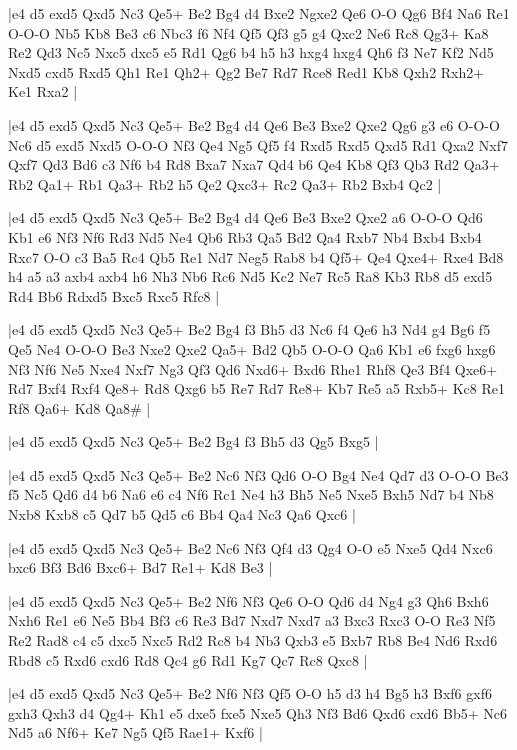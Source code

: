 \whitename{}
\blackname{}
\makegametitle
|e4 d5 exd5 Qxd5 Nc3 Qe5+ Be2 Bg4 d4 Bxe2 Ngxe2 Qe6 O-O Qg6 Bf4 Na6 Re1 O-O-O Nb5 Kb8 Be3 c6 Nbc3 f6 Nf4 Qf5 Qf3 g5 g4 Qxc2 Ne6 Rc8 Qg3+ Ka8 Re2 Qd3 Nc5 Nxc5 dxc5 e5 Rd1 Qg6 b4 h5 h3 hxg4 hxg4 Qh6 f3 Ne7 Kf2 Nd5 Nxd5 cxd5 Rxd5 Qh1 Re1 Qh2+ Qg2 Be7 Rd7 Rce8 Red1 Kb8 Qxh2 Rxh2+ Ke1 Rxa2  |

\whitename{}
\blackname{}
\makegametitle
|e4 d5 exd5 Qxd5 Nc3 Qe5+ Be2 Bg4 d4 Qe6 Be3 Bxe2 Qxe2 Qg6 g3 e6 O-O-O Nc6 d5 exd5 Nxd5 O-O-O Nf3 Qe4 Ng5 Qf5 f4 Rxd5 Rxd5 Qxd5 Rd1 Qxa2 Nxf7 Qxf7 Qd3 Bd6 c3 Nf6 b4 Rd8 Bxa7 Nxa7 Qd4 b6 Qe4 Kb8 Qf3 Qb3 Rd2 Qa3+ Rb2 Qa1+ Rb1 Qa3+ Rb2 h5 Qe2 Qxc3+ Rc2 Qa3+ Rb2 Bxb4 Qc2  |

\whitename{}
\blackname{}
\makegametitle
|e4 d5 exd5 Qxd5 Nc3 Qe5+ Be2 Bg4 d4 Qe6 Be3 Bxe2 Qxe2 a6 O-O-O Qd6 Kb1 e6 Nf3 Nf6 Rd3 Nd5 Ne4 Qb6 Rb3 Qa5 Bd2 Qa4 Rxb7 Nb4 Bxb4 Bxb4 Rxc7 O-O c3 Ba5 Rc4 Qb5 Re1 Nd7 Neg5 Rab8 b4 Qf5+ Qe4 Qxe4+ Rxe4 Bd8 h4 a5 a3 axb4 axb4 h6 Nh3 Nb6 Rc6 Nd5 Kc2 Ne7 Rc5 Ra8 Kb3 Rb8 d5 exd5 Rd4 Bb6 Rdxd5 Bxc5 Rxc5 Rfc8  |

\whitename{}
\blackname{}
\makegametitle
|e4 d5 exd5 Qxd5 Nc3 Qe5+ Be2 Bg4 f3 Bh5 d3 Nc6 f4 Qe6 h3 Nd4 g4 Bg6 f5 Qe5 Ne4 O-O-O Be3 Nxe2 Qxe2 Qa5+ Bd2 Qb5 O-O-O Qa6 Kb1 e6 fxg6 hxg6 Nf3 Nf6 Ne5 Nxe4 Nxf7 Ng3 Qf3 Qd6 Nxd6+ Bxd6 Rhe1 Rhf8 Qe3 Bf4 Qxe6+ Rd7 Bxf4 Rxf4 Qe8+ Rd8 Qxg6 b5 Re7 Rd7 Re8+ Kb7 Re5 a5 Rxb5+ Kc8 Re1 Rf8 Qa6+ Kd8 Qa8\#  |

\whitename{}
\blackname{}
\makegametitle
|e4 d5 exd5 Qxd5 Nc3 Qe5+ Be2 Bg4 f3 Bh5 d3 Qg5 Bxg5  |

\whitename{}
\blackname{}
\makegametitle
|e4 d5 exd5 Qxd5 Nc3 Qe5+ Be2 Nc6 Nf3 Qd6 O-O Bg4 Ne4 Qd7 d3 O-O-O Be3 f5 Nc5 Qd6 d4 b6 Na6 e6 c4 Nf6 Rc1 Ne4 h3 Bh5 Ne5 Nxe5 Bxh5 Nd7 b4 Nb8 Nxb8 Kxb8 c5 Qd7 b5 Qd5 c6 Bb4 Qa4 Nc3 Qa6 Qxc6  |

\whitename{}
\blackname{}
\makegametitle
|e4 d5 exd5 Qxd5 Nc3 Qe5+ Be2 Nc6 Nf3 Qf4 d3 Qg4 O-O e5 Nxe5 Qd4 Nxc6 bxc6 Bf3 Bd6 Bxc6+ Bd7 Re1+ Kd8 Be3  |

\whitename{}
\blackname{}
\makegametitle
|e4 d5 exd5 Qxd5 Nc3 Qe5+ Be2 Nf6 Nf3 Qe6 O-O Qd6 d4 Ng4 g3 Qh6 Bxh6 Nxh6 Re1 e6 Ne5 Bb4 Bf3 c6 Re3 Bd7 Nxd7 Nxd7 a3 Bxc3 Rxc3 O-O Re3 Nf5 Re2 Rad8 c4 c5 dxc5 Nxc5 Rd2 Rc8 b4 Nb3 Qxb3 e5 Bxb7 Rb8 Be4 Nd6 Rxd6 Rbd8 c5 Rxd6 cxd6 Rd8 Qc4 g6 Rd1 Kg7 Qc7 Rc8 Qxc8  |

\whitename{}
\blackname{}
\makegametitle
|e4 d5 exd5 Qxd5 Nc3 Qe5+ Be2 Nf6 Nf3 Qf5 O-O h5 d3 h4 Bg5 h3 Bxf6 gxf6 gxh3 Qxh3 d4 Qg4+ Kh1 e5 dxe5 fxe5 Nxe5 Qh3 Nf3 Bd6 Qxd6 cxd6 Bb5+ Nc6 Nd5 a6 Nf6+ Ke7 Ng5 Qf5 Rae1+ Kxf6  |

